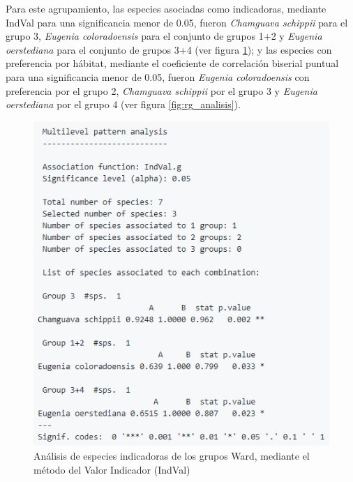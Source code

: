 \documentclass[11pt,]{article}
\begin{document}
Para este agrupamiento, las especies asociadas como indicadoras,
mediante IndVal para una significancia menor de 0.05, fueron
\emph{Chamguava schippii} para el grupo 3, \emph{Eugenia coloradoensis}
para el conjunto de grupos 1+2 y \emph{Eugenia oerstediana} para el
conjunto de grupos 3+4 (ver figura \ref{fig:indval_analisis}); y las
especies con preferencia por hábitat, mediante el coeficiente de
correlación biserial puntual para una significancia menor de 0.05,
fueron \emph{Eugenia coloradoensis} con preferencia por el grupo 2,
\emph{Chamguava schippii} por el grupo 3 y \emph{Eugenia oerstediana}
por el grupo 4 (ver figura \ref{fig:rg_analisis}).

\begin{figure}
\centering
\includegraphics{inval_analisis.png}
\caption{Análisis de especies indicadoras de los grupos Ward, mediante
el método del Valor Indicador (IndVal) \label{fig:indval_analisis}}
\end{figure}
\end{document}
